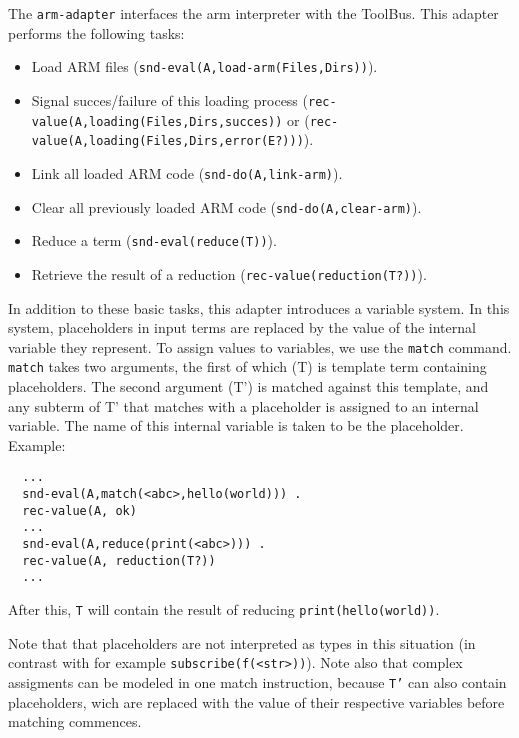 


The {\tt arm-adapter} interfaces the arm interpreter with the
ToolBus. This adapter performs the following tasks:

\begin{itemize}
\item Load ARM files ({\tt snd-eval(A,load-arm(Files,Dirs))}).
\item Signal succes/failure of this loading process\newline
 ({\tt rec-value(A,loading(Files,Dirs,succes))} or\newline
 ({\tt rec-value(A,loading(Files,Dirs,error(E?)))}).
\item Link all loaded ARM code ({\tt snd-do(A,link-arm)}).
\item Clear all previously loaded ARM code ({\tt snd-do(A,clear-arm)}).
\item Reduce a term ({\tt snd-eval(reduce(T))}).
\item Retrieve the result of a reduction ({\tt rec-value(reduction(T?))}).
\end{itemize}

In addition to these basic tasks, this adapter introduces a
variable system. In this system, placeholders in input terms
are replaced by the value of the internal variable they represent.
To assign values to variables, we use the {\tt match} command.
{\tt match} takes two arguments, the first of which (T) is template
term containing placeholders. The second argument (T') is
matched against this template, and any subterm of T' that matches with
a placeholder is assigned to an internal variable. The name of this
internal variable is taken to be the placeholder.
\newline
Example:
\begin{verbatim}
  ...
  snd-eval(A,match(<abc>,hello(world))) .
  rec-value(A, ok)
  ...
  snd-eval(A,reduce(print(<abc>))) .
  rec-value(A, reduction(T?))
  ...
\end{verbatim}
After this, {\tt T} will contain the result of reducing
{\tt print(hello(world))}.

Note that that placeholders are not interpreted as types in this
situation (in contrast with for example {\tt subscribe(f(<str>))}).
Note also that complex assigments can be modeled in one match instruction,
because {\tt T'} can also contain placeholders, wich are replaced with
the value of their respective variables before matching commences.

